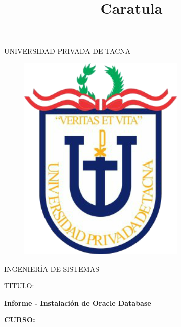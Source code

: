 \documentclass[12pt,letterpaper]{article}
\begin{document}
%


\title{Caratula}

\begin{titlepage}
\begin{center}
\large{UNIVERSIDAD PRIVADA DE TACNA}\\
\vspace*{-0.025in}
\begin{figure}[htb]
\begin{center}
\includegraphics[width=8cm]{./Imagenes/logo}
\end{center}
\end{figure}
\vspace*{0.15in}
INGENIERÍA DE SISTEMAS  \\

\vspace*{0.5in}
\begin{large}
TITULO:\\
\end{large}

\vspace*{0.1in}
\begin{Large}
\textbf{Informe - Instalación de Oracle Database} \\
\end{Large}

\vspace*{0.3in}
\begin{Large}
\textbf{CURSO:} \\
\end{Large}


\end{center}
\end{titlepage}
\end{document}

